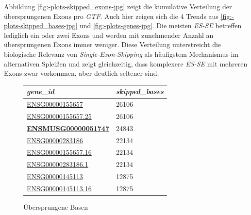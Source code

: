 \documentclass[12pt]{article}
\begin{document}
Abbildung \ref{fig:-plots-skipped_exons-jpg} zeigt die kumulative Verteilung der übersprungenen Exons pro \textit{GTF}.
Auch hier zeigen sich die 4 Trends aus \ref{fig:-plots-skipped_bases-jpg} und \ref{fig:-plots-genes-jpg}.
Die meisten \textit{ES-SE} betreffen lediglich ein oder zwei Exons und werden mit zunehmender Anzahl an
übersprungenen Exons immer weniger.
Diese Verteilung unterstreicht die biologische Relevanz von \textit{Single-Exon-Skipping} als häufigstem Mechanismus im alternativen
Spleißen und zeigt gleichzeitig, dass komplexere \textit{ES-SE} mit mehreren Exons zwar vorkommen,
aber deutlich seltener sind.







\begin{figure}[htbp]
	\centering
	\begin{minipage}{0.45\textwidth}
		\centering
		\caption{Übersprungene Basen}
		\begin{tabular}{l|l}
			\textit{\textbf{gene\_id}}                 & \textit{\textbf{skipped\_bases}} \\\hline
            \href{https://asia.ensembl.org/Homo_sapiens/Gene/Summary?db=core;g=ENSG00000155657;r=2:178525989-178830802}{ENSG00000155657}    & 26106               \\
            \href{https://asia.ensembl.org/Homo_sapiens/Gene/Summary?db=core;g=ENSG00000155657;r=2:178525989-178830802}{ENSG00000155657.25} & 26106               \\
            \href{https://asia.ensembl.org/Mus_musculus/Gene/Summary?db=core;g=ENSMUSG00000051747;r=2:76534324-76812891}{\textbf{ENSMUSG00000051747}} & 24843               \\
            \href{https://asia.ensembl.org/Homo_sapiens/Gene/Idhistory?g=ENSG00000283186}{ENSG00000283186}    & 22134               \\
            \href{https://asia.ensembl.org/Homo_sapiens/Gene/Summary?db=core;g=ENSG00000155657;r=2:178525989-178830802}{ENSG00000155657.16} & 22134               \\
            \href{https://asia.ensembl.org/Homo_sapiens/Gene/Idhistory?g=ENSG00000283186}{ENSG00000283186.1}  & 22134               \\
            \href{https://asia.ensembl.org/Homo_sapiens/Gene/Summary?db=core;g=ENSG00000145113;r=3:195746765-195811973}{ENSG00000145113}    & 12875               \\
            \href{https://asia.ensembl.org/Homo_sapiens/Gene/Summary?db=core;g=ENSG00000145113;r=3:195746765-195811973}{ENSG00000145113.16} & 12875               \\

\end{tabular}
\end{minipage}
\end{figure}
\end{document}
